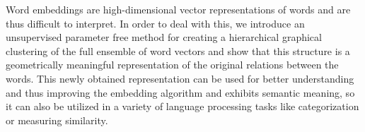 Word embeddings are high-dimensional vector representations of words and are thus difficult to interpret. In order to deal with this, we introduce an unsupervised parameter free method for creating a hierarchical graphical clustering of the full ensemble of word vectors and show that this structure is a geometrically meaningful representation of the original relations between the words. This newly obtained representation can be used for better understanding and thus improving the embedding algorithm and exhibits semantic meaning, so it can also be utilized in a variety of language processing tasks like categorization or measuring similarity.
